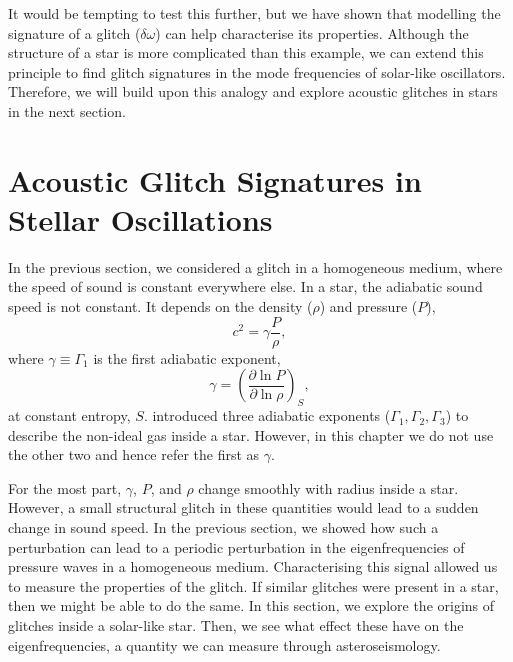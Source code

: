 
It would be tempting to test this further, but we have shown that modelling the signature of a glitch (\(\delta\omega\)) can help characterise its properties. Although the structure of a star is more complicated than this example, we can extend this principle to find glitch signatures in the mode frequencies of solar-like oscillators. Therefore, we will build upon this analogy and explore acoustic glitches in stars in the next section.



\section[Acoustic Glitches in Stars]{Acoustic Glitch Signatures in Stellar Oscillations}\label{sec:glitch-star}

In the previous section, we considered a glitch in a homogeneous medium, where the speed of sound is constant everywhere else. In a star, the adiabatic sound speed is not constant. It depends on the density (\(\rho\)) and pressure (\(P\)),
%
\begin{equation}
    c^2 = \gamma \frac{P}{\rho},\label{eq:sound}
\end{equation}
%
where \(\gamma \equiv \Gamma_1\) is the first adiabatic exponent,
%
\begin{equation}
    \gamma = \left( \frac{\partial \ln P}{\partial \ln \rho} \right)_S,
\end{equation}
%
at constant entropy, \(S\). \citet{Chandrasekhar1939} introduced three adiabatic exponents (\(\Gamma_1,\Gamma_2,\Gamma_3\)) to describe the non-ideal gas inside a star. However, in this chapter we do not use the other two and hence refer the first as \(\gamma\).

For the most part, \(\gamma\), \(P\), and \(\rho\) change smoothly with radius inside a star. However, a small structural glitch in these quantities would lead to a sudden change in sound speed. In the previous section, we showed how such a perturbation can lead to a periodic perturbation in the eigenfrequencies of pressure waves in a homogeneous medium. Characterising this signal allowed us to measure the properties of the glitch. If similar glitches were present in a star, then we might be able to do the same. In this section, we explore the origins of glitches inside a solar-like star. Then, we see what effect these have on the eigenfrequencies, a quantity we can measure through asteroseismology.

